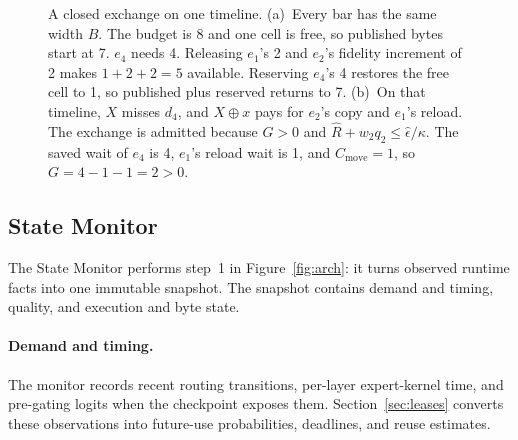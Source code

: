 \begin{figure}[t]
  \centering
  
  \caption{A closed exchange on one timeline.
  (a)~Every bar has the same width \(B\).
  The budget is 8 and one cell is free, so published bytes start at 7.
  \(e_4\) needs 4.
  Releasing \(e_1\)'s 2 and \(e_2\)'s fidelity increment of 2 makes \(1+2+2=5\) available.
  Reserving \(e_4\)'s 4 restores the free cell to 1, so published plus reserved returns to 7.
  (b)~On that timeline, \(X\) misses \(d_4\), and \(X\oplus x\) pays for \(e_2\)'s copy and \(e_1\)'s reload.
  The exchange is admitted because \(G>0\) and \(\widehat R+w_2q_2\le\widehat\epsilon/\kappa\).
  The saved wait of \(e_4\) is 4, \(e_1\)'s reload wait is 1, and \(C_{\mathrm{move}}=1\), so \(G=4-1-1=2>0\).}
  \label{fig:exchange}
\end{figure}

\subsection{State Monitor}
\label{sec:monitor}

The State Monitor performs step~1 in Figure~\ref{fig:arch}: it turns observed runtime facts into one immutable snapshot.
The snapshot contains demand and timing, quality, and execution and byte state.

\paragraph{Demand and timing.}
The monitor records recent routing transitions, per-layer expert-kernel time, and pre-gating logits when the checkpoint exposes them.
Section~\ref{sec:leases} converts these observations into future-use probabilities, deadlines, and reuse estimates.

